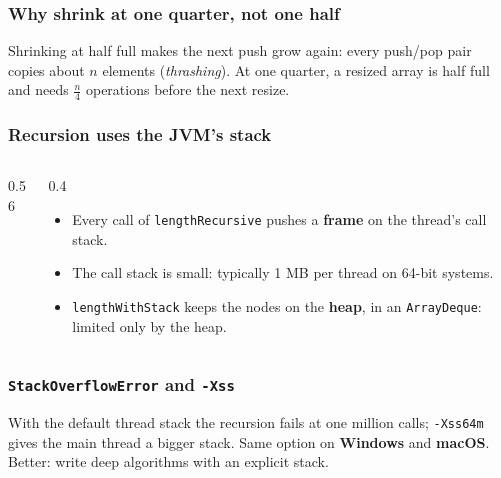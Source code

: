 \documentclass[aspectratio=169,10pt,compress]{beamer}
\newcommand{\win}{\textbf{Windows}}
\newcommand{\mac}{\textbf{macOS}}
\begin{document}
\begin{frame}[t,fragile] \frametitle{Why shrink at one quarter, not one half}

  \vspace{0.2em}
  \small Shrinking at half full makes the next push grow again: every push/pop pair copies about $n$ elements (\emph{thrashing}).
  At one quarter, a resized array is half full and needs $\frac{n}{4}$ operations before the next resize.
\end{frame}





\begin{frame}[t,fragile] \frametitle{Recursion uses the JVM's stack}
  \begin{columns}[T]
    \begin{column}{0.56\textwidth}
    \end{column}
    \begin{column}{0.4\textwidth}
      \begin{itemize}\small
        \item Every call of \texttt{lengthRecursive} pushes a \textbf{frame} on the thread's call stack.
        \item The call stack is small: typically 1 MB per thread on 64-bit systems.
        \item \texttt{lengthWithStack} keeps the nodes on the \textbf{heap}, in an \texttt{ArrayDeque}: limited only by the heap.
      \end{itemize}
    \end{column}
  \end{columns}
\end{frame}




\begin{frame}[t,fragile] \frametitle{\texttt{StackOverflowError} and \texttt{-Xss}}

  \vspace{0.1em}
  \small
  With the default thread stack the recursion fails at one million calls; \texttt{-Xss64m} gives the main thread a bigger stack.
  Same option on \win{} and \mac. Better: write deep algorithms with an explicit stack.
\end{frame}
\end{document}
